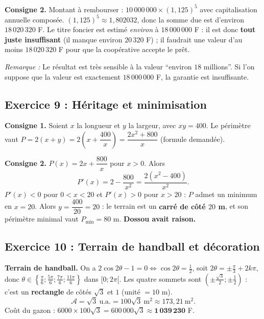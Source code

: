 \documentclass[11pt,a4paper]{article}
\newenvironment{rem}{\par\medskip\noindent\textit{Remarque :}\quad}{\par\medskip}
\begin{document}
\textbf{Consigne 2.} Montant \`a rembourser : $10\,000\,000\times(1{,}125)^5$ avec capitalisation annuelle compos\'ee.
$(1{,}125)^5\approx1{,}802032$, donc la somme due est d'environ $18\,020\,320$ F.
Le titre foncier est estim\'e \emph{environ} \`a $18\,000\,000$ F : il est donc \textbf{tout juste insuffisant}
(il manque environ $20\,320$ F) ; il faudrait une valeur d'au moins $18\,020\,320$ F pour que la coop\'erative accepte le pr\^et.
\begin{rem} Le r\'esultat est tr\`es sensible \`a la valeur ``environ $18$ millions''. Si l'on suppose que la valeur est
exactement $18\,000\,000$ F, la garantie est insuffisante.\end{rem}

\subsection{Exercice 9 : H\'eritage et minimisation}

\textbf{Consigne 1.} Soient $x$ la longueur et $y$ la largeur, avec $xy=400$. Le p\'erim\`etre vaut
$P=2(x+y)=2\left(x+\dfrac{400}{x}\right)=\dfrac{2x^2+800}{x}$ (formule demand\'ee).

\textbf{Consigne 2.} $P(x)=2x+\dfrac{800}{x}$ pour $x>0$. Alors
\[
P'(x)=2-\frac{800}{x^2}=\frac{2(x^2-400)}{x^2}.
\]
$P'(x)<0$ pour $0<x<20$ et $P'(x)>0$ pour $x>20$ : $P$ admet un minimum en $x=20$.
Alors $y=\dfrac{400}{20}=20$ : le terrain est un \textbf{carr\'e de c\^ot\'e $20$ m}, et son p\'erim\`etre minimal vaut $P_{\min}=80$ m.
\textbf{Dossou avait raison.}

\subsection{Exercice 10 : Terrain de handball et d\'ecoration}

\textbf{Terrain de handball.} On a $2\cos2\theta-1=0\iff\cos2\theta=\frac12$, soit $2\theta=\pm\frac{\pi}{3}+2k\pi$,
donc $\theta\in\left\{\frac{\pi}{6};\frac{5\pi}{6};\frac{7\pi}{6};\frac{11\pi}{6}\right\}$ dans $[0;2\pi[$.
Les quatre sommets sont $(\pm\frac{\sqrt3}{2};\pm\frac12)$ : c'est un \textbf{rectangle} de c\^ot\'es $\sqrt3$ et $1$ (unit\'e $=10$ m).
\[
\mathcal A=\sqrt3\ \text{u.a.}=100\sqrt3\ \text{m}^2\approx173{,}21\ \text{m}^2.
\]
Co\^ut du gazon : $6000\times100\sqrt3=600\,000\sqrt3\approx\mathbf{1\,039\,230}$ F.
\end{document}
